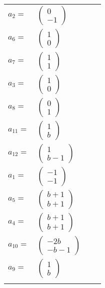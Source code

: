 \documentclass[1p]{elsarticle_modified}
\theoremstyle{definition}
\begin{document}
\begin{tabular}{m{7pt} m{180pt} m{7pt} m{180pt} }
\flushright $a_{2}=$&$\begin{pmatrix}0\\-1\end{pmatrix}$ \\
\flushright $a_{6}=$&$\begin{pmatrix}1\\0\end{pmatrix}$ \\
\flushright $a_{7}=$&$\begin{pmatrix}1\\1\end{pmatrix}$ \\
\flushright $a_{3}=$&$\begin{pmatrix}1\\0\end{pmatrix}$ \\
\flushright $a_{8}=$&$\begin{pmatrix}0\\1\end{pmatrix}$ \\
\flushright $a_{11}=$&$\begin{pmatrix}1\\b\end{pmatrix}$ \\
\flushright $a_{12}=$&$\begin{pmatrix}1\\b-1\end{pmatrix}$ \\
\flushright $a_{1}=$&$\begin{pmatrix}-1\\-1\end{pmatrix}$ \\
\flushright $a_{5}=$&$\begin{pmatrix}b+1\\b+1\end{pmatrix}$ \\
\flushright $a_{4}=$&$\begin{pmatrix}b+1\\b+1\end{pmatrix}$ \\
\flushright $a_{10}=$&$\begin{pmatrix}-2 b\\- b-1\end{pmatrix}$ \\
\flushright $a_{9}=$&$\begin{pmatrix}1\\b\end{pmatrix}$\\&\end{tabular}
\end{document}
